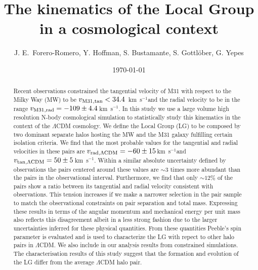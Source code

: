 \documentclass{emulateapj}
\newcommand{\kms}{\,km~s$^{-1}$}
\begin{document}
\title{The kinematics of the Local Group in a cosmological context}
\author{
J. E.\ Forero-Romero, 
Y. Hoffman, 
S. Bustamante, 
S. Gottl\"ober, 
G. Yepes
}


\date{\today}

\begin{abstract}
   
Recent observations constrained the tangential velocity of M31 with
respect to the Milky Way (MW) to be $v_{\rm M31,tan}<34.4$ \kms and
the radial velocity to be in the range $v_{\rm M31,rad}=-109\pm
4.4$\kms \citep{vanderMarel12}. In this study we use a large volume
high resolution N-body cosmological simulation to statistically study
this kinematics in the context of the $\Lambda$CDM cosmology. We
define the Local Group (LG) to be composed by two dominant separate
halos hosting the MW and the M31 galaxy fulfilling certain isolation
criteria. We find that the most probable values for the tangential and
radial velocities in these pairs are $v_{\rm rad, \Lambda CDM}=-60\pm
15$\kms and $v_{\rm tan, \Lambda CDM}=50\pm 5$\kms. Within a similar
absolute uncertainty defined by observations the pairs centered around
these values are $\sim3$ times more abundant than the pairs in the
observational interval. Furthermore, we find that only $\sim12\%$ of
the pairs show a ratio between its tangential and radial velocity
consistent with observations. This tension increases if we make a
narrower selection in the pair sample to match the observational
constraints on pair separation and total mass. Expressing these
results in terms of the angular momentum and mechanical energy per
unit mass also reflects this disagreement albeit in a less strong
fashion due to the larger uncertainties inferred for these physical
quantities. From these quantities Peeble's spin parameter is evaluated
and is used to characterize the LG with repect to other halo pairs in
$\Lambda$CDM. We also include in our analysis results from constrained
simulations. The characterisation results of this study suggest that
the formation and evolution of the LG differ from the average
$\Lambda$CDM halo pair. 
\end{abstract}
\end{document}
